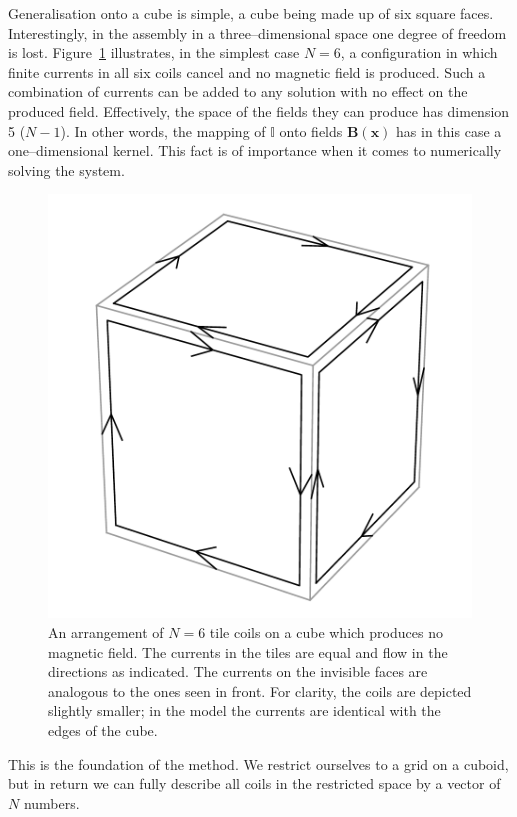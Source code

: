Generalisation onto a cube is simple, a cube being made up of six square faces. Interestingly, in the assembly in a three--dimensional space one degree of freedom is lost.  Figure~\ref{fig:coils_tile_kernel} illustrates, in the simplest case $N = 6$, a configuration in which finite currents in all six coils cancel and no magnetic field is produced. Such a combination of currents can be added to any solution with no effect on the produced field. Effectively, the space of the fields they can produce has dimension 5 ($N-1$). In other words, the mapping of $\mathbb{I}$ onto fields $\mathbf{B}(\mathbf{x})$ has in this case a one--dimensional kernel. This fact is of importance when it comes to numerically solving the system.

\begin{figure}
  \centering
  \includegraphics[width=0.5\linewidth]{gfx/coils/tile_kernel2.pdf}
  \caption{An arrangement of $N = 6$ tile coils on a cube which produces no magnetic field. The currents in the tiles are equal and flow in the directions as indicated. The currents on the invisible faces are analogous to the ones seen in front. For clarity, the coils are depicted slightly smaller; in the model the currents are identical with the edges of the cube.}
  \label{fig:coils_tile_kernel}
\end{figure}

This is the foundation of the method. We restrict ourselves to a grid on a cuboid, but in return we can fully describe all coils in the restricted space by a vector of $N$ numbers.


